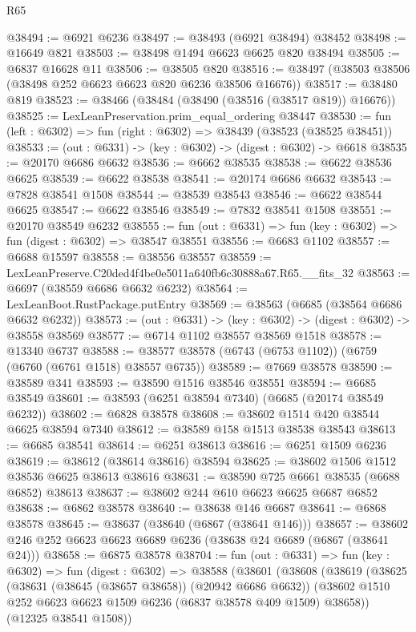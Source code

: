 \begin{lexlean}{R65}
\begin{coremodule}
{@38494 := @6921 @6236
@38497 := @38493 (@6921 @38494) @38452
@38498 := @16649 @821
@38503 := @38498 @1494 @6623 @6625 @820 @38494
@38505 := @6837 @16628 @11
@38506 := @38505 @820
@38516 := @38497 (@38503 @38506 (@38498 @252 @6623 @6623 @820 @6236 @38506 @16676))
@38517 := @38480 @819
@38523 := @38466 (@38484 (@38490 (@38516 (@38517 @819)) @16676))
@38525 := LexLeanPreservation.prim_equal_ordering @38447
@38530 := fun (left : @6302) => fun (right : @6302) => @38439 (@38523 (@38525 @38451))
@38533 := (out : @6331) -> (key : @6302) -> (digest : @6302) -> @6618
@38535 := @20170 @6686 @6632
@38536 := @6662 @38535
@38538 := @6622 @38536 @6625
@38539 := @6622 @38538
@38541 := @20174 @6686 @6632
@38543 := @7828 @38541 @1508
@38544 := @38539 @38543
@38546 := @6622 @38544 @6625
@38547 := @6622 @38546
@38549 := @7832 @38541 @1508
@38551 := @20170 @38549 @6232
@38555 := fun (out : @6331) => fun (key : @6302) => fun (digest : @6302) => @38547 @38551
@38556 := @6683 @1102
@38557 := @6688 @15597
@38558 := @38556 @38557
@38559 := LexLeanPreserve.C20ded4f4be0e5011a640fb6c30888a67.R65.__fits_32
@38563 := @6697 (@38559 @6686 @6632 @6232)
@38564 := LexLeanBoot.RustPackage.putEntry
@38569 := @38563 (@6685 (@38564 @6686 @6632 @6232))
@38573 := (out : @6331) -> (key : @6302) -> (digest : @6302) -> @38558 @38569
@38577 := @6714 @1102 @38557 @38569 @1518
@38578 := @13340 @6737
@38588 := @38577 @38578 (@6743 (@6753 @1102)) (@6759 (@6760 (@6761 @1518) @38557 @6735))
@38589 := @7669 @38578
@38590 := @38589 @341
@38593 := @38590 @1516 @38546 @38551
@38594 := @6685 @38549
@38601 := @38593 (@6251 @38594 @7340) (@6685 (@20174 @38549 @6232))
@38602 := @6828 @38578
@38608 := @38602 @1514 @420 @38544 @6625 @38594 @7340
@38612 := @38589 @158 @1513 @38538 @38543
@38613 := @6685 @38541
@38614 := @6251 @38613
@38616 := @6251 @1509 @6236
@38619 := @38612 (@38614 @38616) @38594
@38625 := @38602 @1506 @1512 @38536 @6625 @38613 @38616
@38631 := @38590 @725 @6661 @38535 (@6688 @6852) @38613
@38637 := @38602 @244 @610 @6623 @6625 @6687 @6852
@38638 := @6862 @38578
@38640 := @38638 @146 @6687
@38641 := @6868 @38578
@38645 := @38637 (@38640 (@6867 (@38641 @146)))
@38657 := @38602 @246 @252 @6623 @6623 @6689 @6236 (@38638 @24 @6689 (@6867 (@38641 @24)))
@38658 := @6875 @38578
@38704 := fun (out : @6331) =>
  fun (key : @6302) =>
  fun (digest : @6302) =>
  @38588
    (@38601
      (@38608
        (@38619
          (@38625
            (@38631 (@38645 (@38657 @38658)) (@20942 @6686 @6632))
            (@38602 @1510 @252 @6623 @6623 @1509 @6236 (@6837 @38578 @409 @1509) @38658))
          (@12325 @38541 @1508))
}
\end{coremodule}
\end{lexlean}
